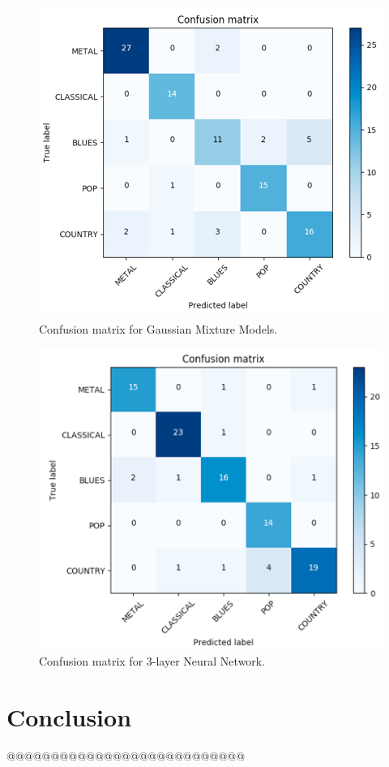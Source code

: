 \begin{figure}
\begin{center}
\includegraphics[scale=0.3]{./figures/confusion_gmm.png}
\end{center}
\caption
{
Confusion matrix for Gaussian Mixture Models. 
}
\label{fig:big_picture5}
\end{figure}

\begin{figure}
\begin{center}
\includegraphics[scale=0.3]{./figures/confusion_simple_NN.png}
\end{center}
\caption
{
Confusion matrix for 3-layer Neural Network.
}
\label{fig:big_picture5}
\end{figure}

\section{Conclusion}\label{sec:conclusion}
@@@@@@@@@@@@@@@@@@@@@@@@@@@

